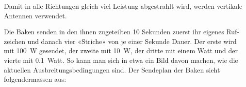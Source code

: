 Damit in alle Richtungen gleich viel Leistung abgestrahlt wird, werden vertikale Antennen ver­wendet. 

Die Baken senden in den ihnen zugeteilten 10 Sekunden zuerst ihr eigenes Ruf­zeichen und danach vier «Striche» von je einer Sekunde Dauer. Der erste wird mit 100 W gesendet, der zweite mit 10 W, der dritte mit einem Watt und der vierte mit 0.1 Watt. So kann man sich in etwa ein Bild davon machen, wie die aktuellen Ausbreitungsbedingungen sind.
Der Sendeplan der Baken sieht folgendermassen aus:











